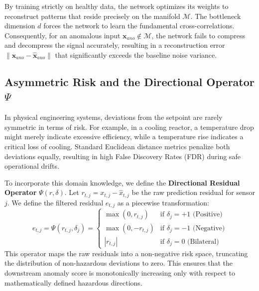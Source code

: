 \documentclass[journal]{IEEEtran}
\begin{document}
	
	By training strictly on healthy data, the network optimizes its weights to reconstruct patterns that reside precisely on the manifold $\mathcal{M}$. The bottleneck dimension $d$ forces the network to learn the fundamental cross-correlations. Consequently, for an anomalous input $\mathbf{x}_{ano} \notin \mathcal{M}$, the network fails to compress and decompress the signal accurately, resulting in a reconstruction error $\| \mathbf{x}_{ano} - \hat{\mathbf{x}}_{ano} \|$ that significantly exceeds the baseline noise variance.
	
	\subsection{Asymmetric Risk and the Directional Operator $\Psi$}
	In physical engineering systems, deviations from the setpoint are rarely symmetric in terms of risk. For example, in a cooling reactor, a temperature drop might merely indicate excessive efficiency, while a temperature rise indicates a critical loss of cooling. Standard Euclidean distance metrics penalize both deviations equally, resulting in high False Discovery Rates (FDR) during safe operational drifts.
	
	To incorporate this domain knowledge, we define the \textbf{Directional Residual Operator} $\Psi(r, \delta)$. Let $r_{t,j} = x_{t,j} - \hat{x}_{t,j}$ be the raw prediction residual for sensor $j$. We define the filtered residual $e_{t,j}$ as a piecewise transformation:
	\begin{equation}
		e_{t,j} = \Psi(r_{t,j}, \delta_j) = 
		\begin{cases} 
			\max(0, r_{t,j}) & \text{if } \delta_j = +1 \text{ (Positive)} \\
			\max(0, -r_{t,j}) & \text{if } \delta_j = -1 \text{ (Negative)} \\
			|r_{t,j}| & \text{if } \delta_j = 0 \text{ (Bilateral)}
		\end{cases}
	\end{equation}
	This operator maps the raw residuals into a non-negative risk space, truncating the distribution of non-hazardous deviations to zero. This ensures that the downstream anomaly score is monotonically increasing only with respect to mathematically defined hazardous directions.
	
\end{document}
